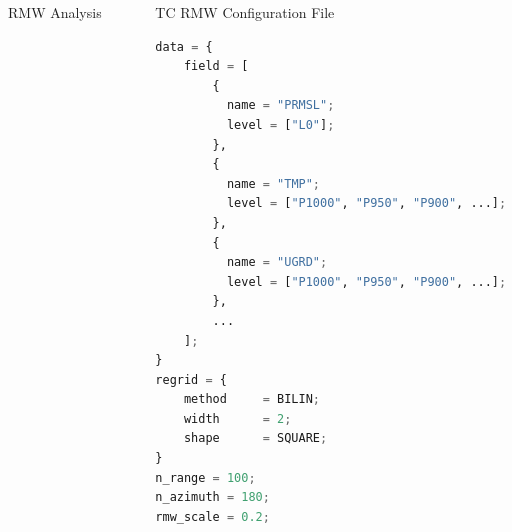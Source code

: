\documentclass[final]{beamer}
\newlength{\sepwid}
\newlength{\onecolwid}
\newlength{\twocolwid}
\begin{document}
\begin{frame}[containsverbatim]
\begin{columns}[t]
\begin{column}{\twocolwid}
\begin{columns}[t,totalwidth=\twocolwid]
\begin{column}{\onecolwid}
\begin{block}{RMW Analysis}
\end{block}


\end{column} %

\end{columns} %

\end{column} %

\begin{column}{\sepwid}\end{column} %

\begin{column}{\onecolwid} %

\begin{block}{TC RMW Configuration File}

\begin{lstlisting}[language=Python]
data = {
    field = [
        {
          name = "PRMSL";
          level = ["L0"];
        },
        {
          name = "TMP";
          level = ["P1000", "P950", "P900", ...];
        },
        {
          name = "UGRD";
          level = ["P1000", "P950", "P900", ...];
        },
        ...
    ];
}
regrid = {
    method     = BILIN;
    width      = 2;
    shape      = SQUARE;
}
n_range = 100;
n_azimuth = 180;
rmw_scale = 0.2;
\end{lstlisting}

\end{block}


\begin{block}

\nocite{*} %
\small{
\vspace{0.75in}}

\end{block}



\end{column}
\end{columns}
\end{frame}
\end{document}
